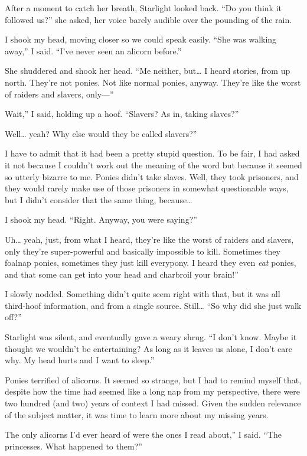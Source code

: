 After a moment to catch her breath, Starlight looked back. “Do you think it followed us?” she asked, her voice barely audible over the pounding of the rain.

I shook my head, moving closer so we could speak easily. “She was walking away,” I said. “I’ve never seen an alicorn before.”

She shuddered and shook her head. “Me neither, but… I heard stories, from up north. They’re not ponies. Not like normal ponies, anyway. They’re like the worst of raiders and slavers, only—”

\leavevmode{}Wait,” I said, holding up a hoof. “Slavers? As in, taking slaves?”

\leavevmode{}Well… yeah? Why else would they be called slavers?”

I have to admit that it had been a pretty stupid question. To be fair, I had asked it not because I couldn’t work out the meaning of the word but because it seemed so utterly bizarre to me. Ponies didn’t take slaves. Well, they took prisoners, and they would rarely make use of those prisoners in somewhat questionable ways, but I didn’t consider that the same thing, because…

I shook my head. “Right. Anyway, you were saying?”

\leavevmode{}Uh… yeah, just, from what I heard, they’re like the worst of raiders and slavers, only they’re super-powerful and basically impossible to kill. Sometimes they foalnap ponies, sometimes they just kill everypony. I heard they even \textit{eat} ponies, and that some can get into your head and charbroil your brain!”

I slowly nodded. Something didn’t quite seem right with that, but it was all third-hoof information, and from a single source. Still… “So why did she just walk off?”

Starlight was silent, and eventually gave a weary shrug. “I don’t know. Maybe it thought we wouldn’t be entertaining? As long as it leaves us alone, I don’t care why. My head hurts and I want to sleep.”

Ponies terrified of alicorns. It seemed so strange, but I had to remind myself that, despite how the time had seemed like a long nap from my perspective, there were two hundred (and two) years of context I had missed. Given the sudden relevance of the subject matter, it was time to learn more about my missing years.

\leavevmode{}The only alicorns I’d ever heard of were the ones I read about,” I said. “The princesses. What happened to them?”

